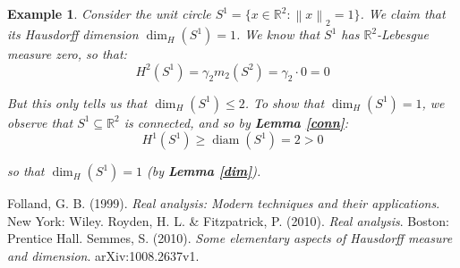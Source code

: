 \documentclass{article}[11pt]
\newcommand*{\R}{\mathbb{R}}
\DeclareMathOperator*{\diam}{diam}
\newcommand\norm[1]{\left\lVert#1\right\rVert}
\theoremstyle{dotless}
\newtheorem{exa}[thm]{Example}
\begin{document}
\begin{exa}
	Consider the unit circle $S^1 = \{ x \in \R^2 : \norm{x}_2 = 1 \}$.
	We claim that its Hausdorff dimension $\dim_H(S^1) = 1$. We know that $S^1$ has $\R^2$-Lebesgue measure zero, so that:
	\[ H^2(S^1) = \gamma_2 m_2(S^2) = \gamma_2 \cdot 0 = 0 \]
	
	\noindent
	But this only tells us that $\dim_H(S^1) \leqslant 2$. To show that $\dim_H(S^1) = 1$, we observe that
	$S^1 \subseteq \R^2$ is \textit{connected}, and so by \textbf{Lemma \ref{conn}}:
	\[ H^1(S^1) \geqslant \diam(S^1) = 2 > 0 \]
	
	\noindent
	so that $\dim_H(S^1) = 1$ (by \textbf{Lemma \ref{dim}}).
\end{exa}

\newpage

\begin{thebibliography}{MMMMM} 
 Folland, G. B. (1999). \textit{Real analysis: Modern techniques and their applications}. New York: Wiley.
 Royden, H. L. \& Fitzpatrick, P. (2010). \textit{Real analysis}. Boston: Prentice Hall.
 Semmes, S. (2010). \textit{Some elementary aspects of Hausdorff measure and dimension}. arXiv:1008.2637v1.
\end{thebibliography}



\end{document}
